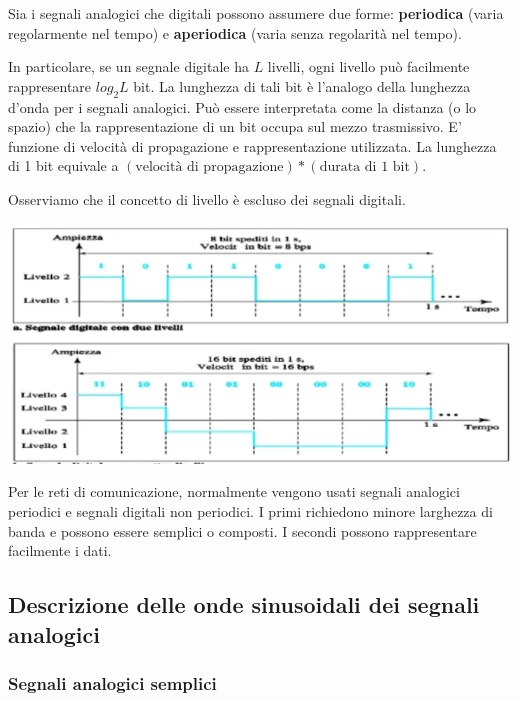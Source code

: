         Sia i segnali analogici che digitali possono assumere due forme: \textbf{periodica} (varia regolarmente nel tempo) e \textbf{aperiodica} (varia senza regolarità nel tempo).
        
        \vspace{3mm}
        
        In particolare, se un segnale digitale ha \(L\) livelli, ogni livello può facilmente rappresentare \(log_2 L\) bit. La lunghezza di tali bit è l'analogo della lunghezza d'onda per i segnali analogici. Può essere interpretata come la distanza (o lo spazio) che la rappresentazione di un bit occupa sul mezzo trasmissivo. E' funzione di velocità di propagazione e rappresentazione utilizzata. La lunghezza di 1 bit equivale a \((\text{velocità di propagazione})*(\text{durata di 1 bit})\).
        
        Osserviamo che il concetto di livello è escluso dei segnali digitali.
        
        \begin{center}
            \includegraphics[scale=0.45]{images/Segnali-Digitali-Esempio.png}
        \end{center}
        
        \vspace{3mm}
        
        Per le reti di comunicazione, normalmente vengono usati segnali analogici periodici e segnali digitali non periodici. I primi richiedono minore larghezza di banda e possono essere semplici o composti. I secondi possono rappresentare facilmente i dati.
    
    \subsection{Descrizione delle onde sinusoidali dei segnali analogici}
    
        \subsubsection{Segnali analogici semplici}
    
